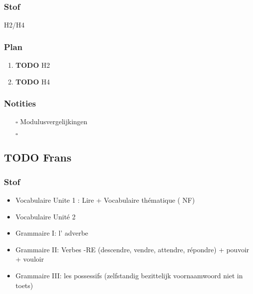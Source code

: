\documentclass[11pt]{article}
\begin{document}
\subsubsection{Stof}
\label{sec:orgc8caaac}
H2/H4
\subsubsection{Plan}
\label{sec:orgc65c68e}
\begin{enumerate}
\item {\bfseries\sffamily TODO} H2
\label{sec:org5e74ac8}
\item {\bfseries\sffamily TODO} H4
\label{sec:org8e6625e}
\end{enumerate}
\subsubsection{Notities}
\label{sec:orgeef6071}
\begin{itemize}
\item[{$\square$}] Modulusvergelijkingen
\item[{$\square$}] 
\end{itemize}
\subsection{{\bfseries\sffamily TODO} Frans}
\label{sec:org1066c6e}
\subsubsection{Stof}
\label{sec:org1c05206}
\begin{itemize}
\item Vocabulaire Unite 1 : Lire + Vocabulaire thématique ( NF)
\item Vocabulaire Unité 2
\item Grammaire I: l' adverbe
\item Grammaire II: Verbes -RE  (descendre, vendre, attendre, répondre) + pouvoir + vouloir
\item Grammaire III: les possessifs  (zelfstandig bezittelijk voornaamwoord niet in toets)
\end{itemize}
\end{document}
